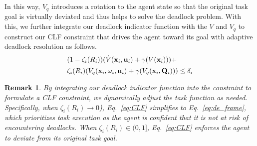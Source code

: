 \documentclass[letterpaper, 10 pt, conference]{ieeeconf}
\theoremstyle{plain}
\newtheorem{remark}{Remark}
\begin{document}
In this way, $V_q$ introduces a rotation to the agent state so that the original task goal is virtually deviated and thus helps to solve the deadlock problem.
With this, we further integrate our deadlock indicator function with the $V$ and $V_q$ to construct our CLF constraint that drives the agent toward its goal with adaptive deadlock resolution as follows.
{\small\begin{align}
& (1 - \zeta_i(R_i))(\dot{V}(\mathbf{x}_i, \mathbf{u}_i) + \gamma (V(\mathbf{x}_i))) + \notag \\
& \zeta_i(R_i) (\dot{V}_q(\mathbf{x}_i, \omega_i, \mathbf{u}_i) + \gamma (V_q(\mathbf{x}_i, \mathbf{Q}_i))) \le \delta_i \label{eq:CLF}
\end{align}}
\begin{remark}\label{remark:CLF}
By integrating our deadlock indicator function into the constraint to formulate a CLF constraint, we dynamically adjust the task function as needed. 
Specifically, when $\zeta_i(R_i) \rightarrow 0$), Eq.~\eqref{eq:CLF}
simplifies to
Eq.~\eqref{eq:de_frame}, 
which prioritizes task execution as the agent is confident that it is not at risk of encountering deadlocks.
When $\zeta_i(R_i) \in (0,1]$, Eq.~\eqref{eq:CLF} enforces the agent to deviate from its original task goal.
\end{remark}

 
\end{document}
